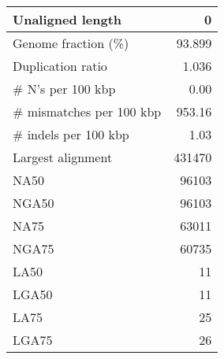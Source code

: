 \documentclass[12pt,a4paper]{article}
\begin{document}
\begin{table}[ht]
\begin{center}
\begin{tabular}{|l*{1}{|r}|}
Unaligned length & 0 \\ \hline
Genome fraction (\%) & 93.899 \\ \hline
Duplication ratio & 1.036 \\ \hline
\# N's per 100 kbp & 0.00 \\ \hline
\# mismatches per 100 kbp & 953.16 \\ \hline
\# indels per 100 kbp & 1.03 \\ \hline
Largest alignment & 431470 \\ \hline
NA50 & 96103 \\ \hline
NGA50 & 96103 \\ \hline
NA75 & 63011 \\ \hline
NGA75 & 60735 \\ \hline
LA50 & 11 \\ \hline
LGA50 & 11 \\ \hline
LA75 & 25 \\ \hline
LGA75 & 26 \\ \hline
\end{tabular}
\end{center}
\end{table}
\end{document}
